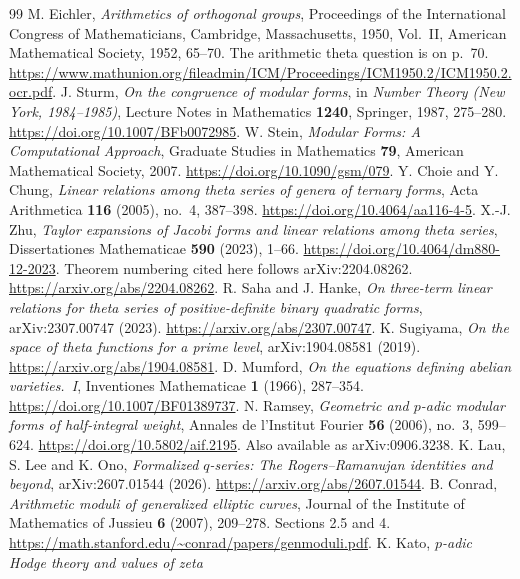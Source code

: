 \documentclass[11pt]{article}
\theoremstyle{remark}\newtheorem{remark}[theorem]{Remark}
\begin{document}
\begin{thebibliography}{99}
\small
{} M. Eichler, \emph{Arithmetics of orthogonal groups},
Proceedings of the International Congress of Mathematicians,
Cambridge, Massachusetts, 1950, Vol.~II, American Mathematical Society,
1952, 65--70. The arithmetic theta question is on p.~70.
\url{https://www.mathunion.org/fileadmin/ICM/Proceedings/ICM1950.2/ICM1950.2.ocr.pdf}.
 J. Sturm, \emph{On the congruence of modular forms},
in \emph{Number Theory (New York, 1984--1985)}, Lecture Notes in Mathematics
\textbf{1240}, Springer, 1987, 275--280.
\url{https://doi.org/10.1007/BFb0072985}.
 W. Stein, \emph{Modular Forms: A Computational Approach},
Graduate Studies in Mathematics \textbf{79}, American Mathematical Society,
2007. \url{https://doi.org/10.1090/gsm/079}.
 Y. Choie and Y. Chung, \emph{Linear relations among
theta series of genera of ternary forms}, Acta Arithmetica
\textbf{116} (2005), no.~4, 387--398.
\url{https://doi.org/10.4064/aa116-4-5}.
 X.-J. Zhu, \emph{Taylor expansions of Jacobi forms and linear
relations among theta series}, Dissertationes Mathematicae \textbf{590}
(2023), 1--66. \url{https://doi.org/10.4064/dm880-12-2023}.
Theorem numbering cited here follows arXiv:2204.08262.
\url{https://arxiv.org/abs/2204.08262}.
 R. Saha and J. Hanke, \emph{On three-term linear
relations for theta series of positive-definite binary quadratic forms},
arXiv:2307.00747 (2023). \url{https://arxiv.org/abs/2307.00747}.
 K. Sugiyama, \emph{On the space of theta functions for
a prime level}, arXiv:1904.08581 (2019).
\url{https://arxiv.org/abs/1904.08581}.
 D. Mumford, \emph{On the equations defining abelian
varieties.~I}, Inventiones Mathematicae \textbf{1} (1966), 287--354.
\url{https://doi.org/10.1007/BF01389737}.
 N. Ramsey, \emph{Geometric and $p$-adic modular forms
of half-integral weight}, Annales de l'Institut Fourier \textbf{56}
(2006), no.~3, 599--624. \url{https://doi.org/10.5802/aif.2195}.
Also available as arXiv:0906.3238.
 K. Lau, S. Lee and K. Ono, \emph{Formalized
$q$-series: The Rogers--Ramanujan identities and beyond},
arXiv:2607.01544 (2026). \url{https://arxiv.org/abs/2607.01544}.
 B. Conrad, \emph{Arithmetic moduli of generalized elliptic
curves}, Journal of the Institute of Mathematics of Jussieu
\textbf{6} (2007), 209--278. Sections 2.5 and 4.
\url{https://math.stanford.edu/~conrad/papers/genmoduli.pdf}.
 K. Kato, \emph{$p$-adic Hodge theory and values of zeta
}
\end{thebibliography}
\end{document}
